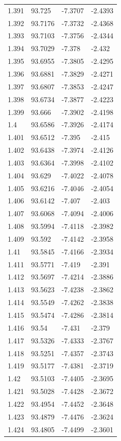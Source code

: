 \begin{tabular}{llll}
1.391 & 93.725 & -7.3707 & -2.4393 \\
1.392 & 93.7176 & -7.3732 & -2.4368 \\
1.393 & 93.7103 & -7.3756 & -2.4344 \\
1.394 & 93.7029 & -7.378 & -2.432 \\
1.395 & 93.6955 & -7.3805 & -2.4295 \\
1.396 & 93.6881 & -7.3829 & -2.4271 \\
1.397 & 93.6807 & -7.3853 & -2.4247 \\
1.398 & 93.6734 & -7.3877 & -2.4223 \\
1.399 & 93.666 & -7.3902 & -2.4198 \\
1.4 & 93.6586 & -7.3926 & -2.4174 \\
1.401 & 93.6512 & -7.395 & -2.415 \\
1.402 & 93.6438 & -7.3974 & -2.4126 \\
1.403 & 93.6364 & -7.3998 & -2.4102 \\
1.404 & 93.629 & -7.4022 & -2.4078 \\
1.405 & 93.6216 & -7.4046 & -2.4054 \\
1.406 & 93.6142 & -7.407 & -2.403 \\
1.407 & 93.6068 & -7.4094 & -2.4006 \\
1.408 & 93.5994 & -7.4118 & -2.3982 \\
1.409 & 93.592 & -7.4142 & -2.3958 \\
1.41 & 93.5845 & -7.4166 & -2.3934 \\
1.411 & 93.5771 & -7.419 & -2.391 \\
1.412 & 93.5697 & -7.4214 & -2.3886 \\
1.413 & 93.5623 & -7.4238 & -2.3862 \\
1.414 & 93.5549 & -7.4262 & -2.3838 \\
1.415 & 93.5474 & -7.4286 & -2.3814 \\
1.416 & 93.54 & -7.431 & -2.379 \\
1.417 & 93.5326 & -7.4333 & -2.3767 \\
1.418 & 93.5251 & -7.4357 & -2.3743 \\
1.419 & 93.5177 & -7.4381 & -2.3719 \\
1.42 & 93.5103 & -7.4405 & -2.3695 \\
1.421 & 93.5028 & -7.4428 & -2.3672 \\
1.422 & 93.4954 & -7.4452 & -2.3648 \\
1.423 & 93.4879 & -7.4476 & -2.3624 \\
1.424 & 93.4805 & -7.4499 & -2.3601 \\

\end{tabular}
